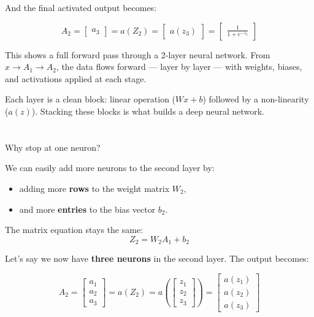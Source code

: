 \documentclass[11pt]{article}
\begin{document}
And the final activated output becomes:

\[
A_2 = 
\begin{bmatrix}
a_3
\end{bmatrix}
= a(Z_2) = 
\begin{bmatrix}
a(z_3)
\end{bmatrix}
= \begin{bmatrix}
\frac{1}{1 + e^{-z_3}}
\end{bmatrix}
\]

\vspace{2em}

This shows a full forward pass through a 2-layer neural network.  
From $x \rightarrow A_1 \rightarrow A_2$, the data flows forward — layer by layer —  
with weights, biases, and activations applied at each stage.

\vspace{1em}

\begin{tcolorbox}[colback=green!5, colframe=green!60!black, title=Key Insight]
Each layer is a clean block: linear operation ($Wx + b$) followed by a non-linearity ($a(z)$).  
Stacking these blocks is what builds a deep neural network.
\end{tcolorbox}
\section*{}

Why stop at one neuron?

We can easily add more neurons to the second layer by:

\begin{itemize}
  \item adding more \textbf{rows} to the weight matrix $W_2$,
  \item and more \textbf{entries} to the bias vector $b_2$.
\end{itemize}

\begin{tcolorbox}[colback=gray!5, colframe=gray!60!black, title={Same Logic, More Neurons}]
The matrix equation stays the same:
\[
Z_2 = W_2 A_1 + b_2
\]
\end{tcolorbox}

Let’s say we now have \textbf{three neurons} in the second layer.  
The output becomes:

\[
A_2 = 
\begin{bmatrix}
a_1 \\
a_2 \\
a_3
\end{bmatrix}
= a(Z_2) = 
a\left(
\begin{bmatrix}
z_1 \\
z_2 \\
z_3
\end{bmatrix}
\right)
=
\begin{bmatrix}
a(z_1) \\
a(z_2) \\
a(z_3)
\end{bmatrix}
\]
\end{document}

